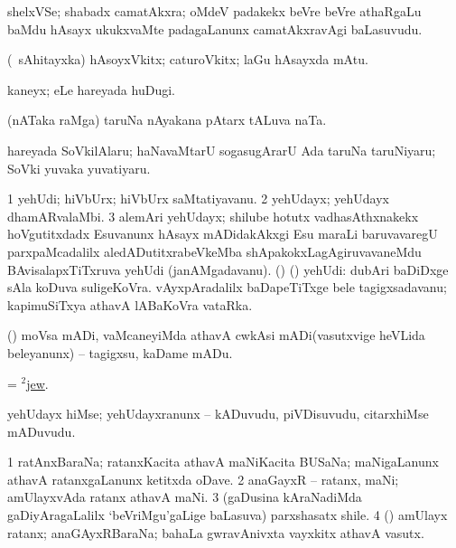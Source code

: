 \bentry
{}
\gl{\nA}
\expl{\F}
\bmng
shelxVSe; shabadx camatAkxra; oMdeV padakekx beVre beVre athaRgaLu baMdu hAsayx ukukxvaMte padagaLanunx camatAkxravAgi baLasuvudu. 
\emng
\eentry

\bentry
{}
\gl{\nA}
\bmng
 (\sA\ sAhitayxka) hAsoyxVkitx; caturoVkitx; laGu hAsayxda mAtu. 
\emng
\eentry

\bentry
{}
\gl{\nA}
\expl{\F}
\bmng
kaneyx; eLe hareyada huDugi. 
\emng
\eentry

\bentry
{}
\gl{\nA}
\expl{\F}
\bmng
(nATaka raMga) taruNa nAyakana pAtarx tALuva naTa. 
\emng
\eentry

\bentry
{}
\gl{\nA}
\expl{\F}
\bmng
hareyada SoVkilAlaru; haNavaMtarU sogasugArarU Ada taruNa taruNiyaru; SoVki yuvaka yuvatiyaru. 
\emng
\eentry

\bentry
{}
\gl{\nA}
\bmng
\bnum
\num{1} yehUdi; hiVbUrx; hiVbUrx saMtatiyavanu. 
\num{2} yehUdayx; yehUdayx dhamARvalaMbi. 
\num{3} alemAri yehUdayx; shilube hotutx vadhasAthxnakekx hoVgutitxdadx Esuvanunx hAsayx mADidakAkxgi Esu maraLi baruvavaregU parxpaMcadalilx aledADutitxrabeVkeMba shApakokxLagAgiruvavaneMdu BAvisalapxTiTxruva yehUdi (janAMgadavanu). 
 (\hiV) (\AmA) yehUdi: 
\banum
{} dubAri baDiDxge sAla koDuva suligeKoVra. 
 vAyxpAradalilx baDapeTiTxge bele tagigxsadavanu; kapimuSiTxya athavA lABaKoVra vataRka. 
\eanum
\numie
\enum
\emng
\eentry

\bentry
{}
\gl{\sakirx}
\bmng
(\ashi) moVsa mADi, vaMcaneyiMda athavA cwkAsi mADi(vasutxvige heVLida beleyanunx) -- tagigxsu, kaDame mADu. 
\emng

\noindent
\gl{\pagu}
\bmng
{} = \hyperlink{jew(2)}{$^2$jew}. 
\emng
\eentry

\bentry
{}
\gl{\nA}
\bmng
yehUdayx hiMse; yehUdayxranunx -- kADuvudu, piVDisuvudu, citarxhiMse mADuvudu. 
\emng
\eentry

\bentry
{}
\gl{\nA}
\bmng
\bnum
\num{1} ratAnxBaraNa; ratanxKacita athavA maNiKacita BUSaNa; maNigaLanunx athavA ratanxgaLanunx ketitxda oDave. 
\num{2} anaGayxR -- ratanx, maNi; amUlayxvAda ratanx athavA maNi. 
\num{3} (gaDusina kAraNadiMda gaDiyAragaLalilx `beVriMgu'gaLige baLasuva) parxshasatx shile. 
\num{4} (\rUpa) amUlayx ratanx; anaGAyxRBaraNa; bahaLa gwravAnivxta vayxkitx athavA vasutx. 
\enum
\emng
\eentry


